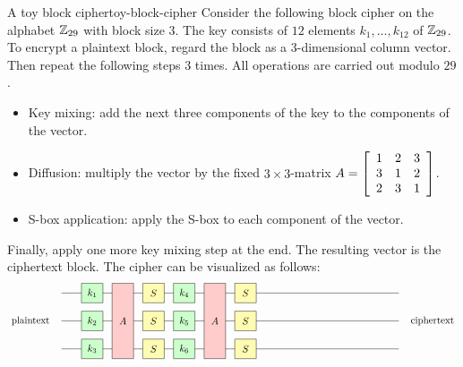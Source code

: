 \documentclass{ximera}
\begin{document}
\begin{definition}{A toy block cipher}{toy-block-cipher}
  Consider the following block cipher on the alphabet $\Z_{29}$ with
  block size $3$. The key consists of $12$ elements $k_1,\ldots,k_{12}$
  of $\Z_{29}$. To encrypt a plaintext block, regard the block as a
  $3$-dimensional column vector. Then repeat the following steps $3$
  times. All operations are carried out modulo $29$.
  \begin{itemize}
  \item Key mixing: add the next three components of the key to the
    components of the vector.
  \item Diffusion: multiply the vector by the fixed $3\times 3$-matrix
    $A = \startmat{ccc}
      1 & 2 & 3 \\
      3 & 1 & 2 \\
      2 & 3 & 1 \\
    \stopmat$.
  \item S-box application: apply the S-box to each component of the
    vector.
  \end{itemize}
  Finally, apply one more key mixing step at the end. The resulting
  vector is the ciphertext block. The cipher can be visualized as
  follows:
  \begin{equation*}
    \begin{tikzpicture}[xscale=1.1,
      a/.style={fill=red!20},
      s/.style={fill=yellow!30},
      k/.style={fill=green!20}]
      \draw (0,2) -- (11,2);
      \draw (0,1) node[left=2ex]{plaintext} -- (11,1) node[right=2ex]{ciphertext};
      \draw (0,0) -- (11,0);
      \draw[k] (1,2) +(-0.35,-0.35) rectangle node{$k_1$} +(0.35,0.35);
      \draw[k] (1,1) +(-0.35,-0.35) rectangle node{$k_2$} +(0.35,0.35);
      \draw[k] (1,0) +(-0.35,-0.35) rectangle node{$k_3$} +(0.35,0.35);
      \draw[a] (2,0) +(-0.35,-0.35) rectangle node{$A$} +(0.35,2.35);
      \draw[s] (3,2) +(-0.35,-0.35) rectangle node{$S$} +(0.35,0.35);
      \draw[s] (3,1) +(-0.35,-0.35) rectangle node{$S$} +(0.35,0.35);
      \draw[s] (3,0) +(-0.35,-0.35) rectangle node{$S$} +(0.35,0.35);
      \draw[k] (4,2) +(-0.35,-0.35) rectangle node{$k_4$} +(0.35,0.35);
      \draw[k] (4,1) +(-0.35,-0.35) rectangle node{$k_5$} +(0.35,0.35);
      \draw[k] (4,0) +(-0.35,-0.35) rectangle node{$k_6$} +(0.35,0.35);
      \draw[a] (5,0) +(-0.35,-0.35) rectangle node{$A$} +(0.35,2.35);
      \draw[s] (6,2) +(-0.35,-0.35) rectangle node{$S$} +(0.35,0.35);
      \draw[s] (6,1) +(-0.35,-0.35) rectangle node{$S$} +(0.35,0.35);
      \draw[s] (6,0) +(-0.35,-0.35) rectangle node{$S$} +(0.35,0.35);

\end{tikzpicture}
\end{equation*}
\end{definition}
\end{document}
